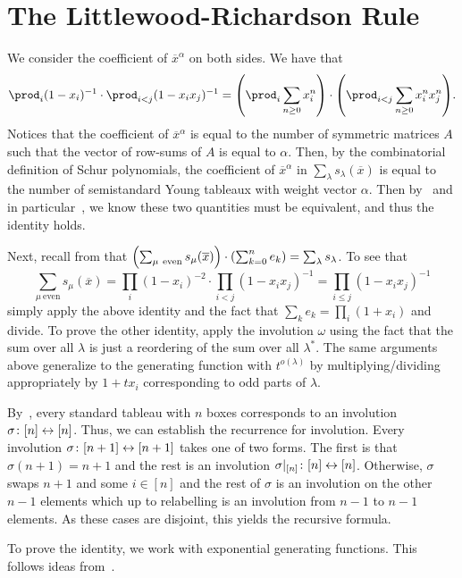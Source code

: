 \documentclass[letterpaper, 11pt, oneside]{book}
\begin{document}
\clearpage

\section{The Littlewood-Richardson Rule}

\begin{sol}\label{ex:Manivel_1.5.4}
  We consider the coefficient of $\overline{x}^{\alpha}$ on both sides.
  We have that
  \[
    \prod_{i} (1 - x_{i})^{-1} \cdot \prod_{i < j} (1 - x_{i}x_{j})^{-1} = \pqty{\prod_{i} \sum_{n \geq 0} x_{i}^{n}} \cdot \pqty{\prod_{i < j} \sum_{n \geq 0} x_{i}^{n}x_{j}^{n}}.
  \]
  Notices that the coefficient of $\overline{x}^{\alpha}$ is equal to the number of symmetric matrices $A$ such that the vector of row-sums of $A$ is equal to $\alpha$.
  Then, by the combinatorial definition of Schur polynomials, the coefficient of $\overline{x}^{\alpha}$ in $\sum_{\lambda} s_{\lambda}(\overline{x})$ is equal to the number of semistandard Young tableaux with weight vector $\alpha$.
  Then by~\cite[Knuth Correspondence 1.3.4]{book:Manivel} and in particular~\cite[Corollary 1.5.3]{book:Manivel}, we know these two quantities must be equivalent, and thus the identity holds.

  Next, recall from  that $\pqty{\sum_{\mu\ \text{even}} s_{\mu}(\overline{x})} \cdot \pqty{\sum_{k = 0}^{n} e_{k}} = \sum_{\lambda} s_{\lambda}$.
  To see that
  \[
    \sum_{\mu\ \text{even}} s_{\mu}(\overline{x}) = \prod_{i} (1 - x_{i})^{-2} \cdot \prod_{i < j} (1 - x_{i}x_{j})^{-1} = \prod_{i \leq j} (1 - x_{i}x_{j})^{-1}
  \]
  simply apply the above identity and the fact that $\sum_{k} e_{k} = \prod_{i} (1 + x_{i})$ and divide.
  To prove the other identity, apply the involution $\omega$ using the fact that the sum over all $\lambda$ is just a reordering of the sum over all $\lambda^{*}$.
  The same arguments above generalize to the generating function with $t^{o(\lambda)}$ by multiplying/dividing appropriately by $1 + tx_{i}$ corresponding to odd parts of $\lambda$.
\end{sol}

\begin{sol}\label{ex:Manivel_1.5.6}
  By~\cite[Corollary 1.5.3]{book:Manivel}, every standard tableau with $n$ boxes corresponds to an involution $\sigma\colon [n] \leftrightarrow [n]$.
  Thus, we can establish the recurrence for involution.
  Every involution $\sigma\colon [n + 1] \leftrightarrow [n + 1]$ takes one of two forms.
  The first is that $\sigma(n + 1) = n + 1$ and the rest is an involution $\sigma|_{[n]}\colon [n] \leftrightarrow [n]$.
  Otherwise, $\sigma$ swaps $n + 1$ and some $i \in [n]$ and the rest of $\sigma$ is an involution on the other $n - 1$ elements which up to relabelling is an involution from $n - 1$ to $n - 1$ elements.
  As these cases are disjoint, this yields the recursive formula.

  To prove the identity, we work with exponential generating functions.
  This follows ideas from~\cite[Example 7.8.5]{book:ECII}.
\end{sol}

\printbibliography
\end{document}
